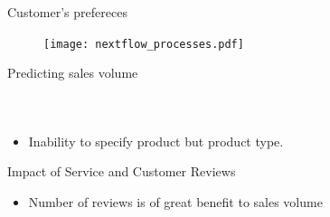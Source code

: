 \documentclass{beamer}
\begin{document}
\begin{frame}[t]{Customer's prefereces} \vspace{5pt}
\centering
\begin{figure}
\texttt{[image: nextflow\_processes.pdf]}
\centering
\end{figure}
\end{frame}



\begin{frame}[t]{Predicting sales volume} \vspace{30pt}
\begin{columns}[onlytextwidth]
\centering
\begin{figure}
\centering
\end{figure}
\centering
\begin{figure}
\centering
\end{figure}
\end{columns}
\vspace{10pt}
\centering
\begin{itemize}
\item Inability to specify product but product type.
\end{itemize}
\centering
\end{frame}


\begin{frame}[t]{Impact of Service and Customer Reviews} \vspace{4pt}
\centering
\begin{figure}
\centering
\end{figure}
\vspace{10pt}
\centering
\begin{itemize}
\item Number of reviews is of great benefit to sales volume
\end{itemize}
\centering
\end{frame}
\end{document}
